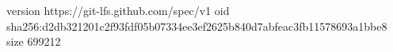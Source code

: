 version https://git-lfs.github.com/spec/v1
oid sha256:d2db321201c2f93fdf05b07334ee3ef2625b840d7abfeac3fb11578693a1bbe8
size 699212
